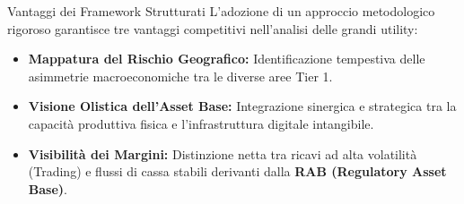 \begin{frame}{Vantaggi dei Framework Strutturati}
    L'adozione di un approccio metodologico rigoroso garantisce tre vantaggi competitivi nell'analisi delle grandi utility:
    \vspace{0.3cm}

    \begin{itemize}
        \item \textbf{Mappatura del Rischio Geografico:} Identificazione tempestiva delle asimmetrie macroeconomiche tra le diverse aree Tier 1.
        \pause
        
        \item \textbf{Visione Olistica dell'Asset Base:} Integrazione sinergica e strategica tra la capacità produttiva fisica e l'infrastruttura digitale intangibile.
        \pause
        
        \item \textbf{Visibilità dei Margini:} Distinzione netta tra ricavi ad alta volatilità (Trading) e flussi di cassa stabili derivanti dalla \textbf{RAB (Regulatory Asset Base)}.
    \end{itemize}
\end{frame}
